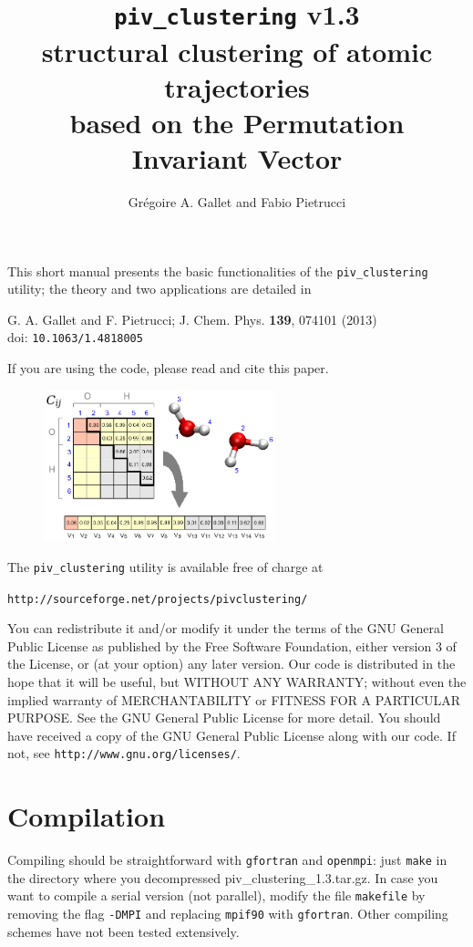 \documentclass[a4paper,11pt]{article}
\author{Gr\'egoire A. Gallet and Fabio Pietrucci}
\title{\texttt{piv\_clustering} v1.3\\ {\color{blue}structural clustering of atomic trajectories \\ based on the Permutation Invariant Vector}}
\begin{document}
\maketitle
This short manual presents the basic functionalities of the \texttt{piv\_clustering} utility;
the theory and two applications are detailed in
\begin{center} {\large G. A. Gallet and F. Pietrucci; J. Chem. Phys. \textbf{139}, 074101 (2013) \\
doi: \texttt{10.1063/1.4818005}}\end{center}
If you are using the code, please read and cite this paper.\\
\begin{figure}[!ht]
  \centering
  \includegraphics[width=0.6\textwidth]{./piv.eps}
\end{figure}

The \texttt{piv\_clustering} utility is available free of charge at 
\begin{center}
\texttt{http://sourceforge.net/projects/pivclustering/} \\ 
\end{center}
You can redistribute it and/or modify it under the
terms of the GNU General Public License as published by the Free
Software Foundation, either version 3 of the License, or (at your option)
any later version. Our code is distributed in the hope that it will be useful,
but WITHOUT ANY WARRANTY; without even the implied warranty of
MERCHANTABILITY or FITNESS FOR A PARTICULAR PURPOSE. See
the GNU General Public License for more detail. You should have
received a copy of the GNU General Public License along with our code.
If not, see \texttt{http://www.gnu.org/licenses/}.\\

\newpage

\section{Compilation}
  Compiling should be straightforward  with \texttt{gfortran} and \texttt{openmpi}:
  just \texttt{make} in the directory where you decompressed piv\_clustering\_1.3.tar.gz.
  In case you want to compile a serial version (not parallel), modify the file \texttt{makefile} by removing the flag
  \texttt{-DMPI} and replacing \texttt{mpif90} with \texttt{gfortran}.
  Other compiling schemes have not been tested extensively.
\end{document}
